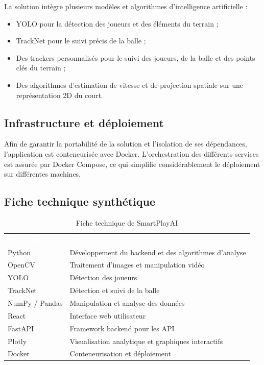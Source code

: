 \begin{itemize}
La solution intègre plusieurs modèles et algorithmes d’intelligence artificielle :

\begin{itemize}
    \item YOLO pour la détection des joueurs et des éléments du terrain ;
    \item TrackNet pour le suivi précis de la balle ;
    \item Des trackers personnalisés pour le suivi des joueurs, de la balle et des points clés du terrain ;
    \item Des algorithmes d’estimation de vitesse et de projection spatiale sur une représentation 2D du court.
\end{itemize}

\subsection{Infrastructure et déploiement}

Afin de garantir la portabilité de la solution et l’isolation de ses dépendances, l’application est conteneurisée avec Docker. L’orchestration des différents services est assurée par Docker Compose, ce qui simplifie considérablement le déploiement sur différentes machines.

\subsection{Fiche technique synthétique}

\begin{table}[H]
  \centering
  \renewcommand{\arraystretch}{1.3}
  \begin{tabularx}{\textwidth}{C{4cm} X}
    \textcolor{white}{\textbf{Technologie}} &
    \textcolor{white}{\textbf{Rôle}} \\
    Python & Développement du backend et des algorithmes d'analyse \\
    OpenCV & Traitement d'images et manipulation vidéo \\
    YOLO & Détection des joueurs \\
    TrackNet & Détection et suivi de la balle \\
    NumPy / Pandas & Manipulation et analyse des données \\
    React & Interface web utilisateur \\
    FastAPI & Framework backend pour les API \\
    Plotly & Visualisation analytique et graphiques interactifs \\
    Docker & Conteneurisation et déploiement \\
  \end{tabularx}
  \caption{Fiche technique de SmartPlayAI}
  \label{tab:fiche_technique}
\end{table}


\end{itemize}
